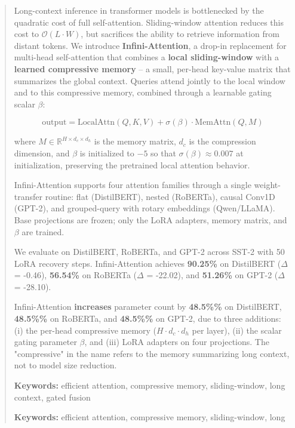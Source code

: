 \documentclass[10pt,twocolumn,letterpaper]{article}
\begin{document}
\maketitle

\begin{abstract}
Long-context inference in transformer models is bottlenecked by the quadratic 
cost of full self-attention. Sliding-window attention reduces this cost to 
$\mathcal{O}(L \cdot W)$, but sacrifices the ability to retrieve information 
from distant tokens. We introduce \textbf{Infini-Attention}, a drop-in replacement 
for multi-head self-attention that combines a \textbf{local sliding-window} with a 
\textbf{learned compressive memory} -- a small, per-head key-value matrix that 
summarizes the global context. Queries attend jointly to the local window and 
to this compressive memory, combined through a learnable gating scalar $\beta$:

\[
\text{output} = \text{LocalAttn}(Q, K, V) + \sigma(\beta) \cdot \text{MemAttn}(Q, M)
\]

where $M \in \mathbb{R}^{H \times d_c \times d_h}$ is the memory matrix, 
$d_c$ is the compression dimension, and $\beta$ is initialized to $-5$ so 
that $\sigma(\beta) \approx 0.007$ at initialization, preserving the 
pretrained local attention behavior.

Infini-Attention supports four attention families through a single 
weight-transfer routine: flat (DistilBERT), nested (RoBERTa), causal Conv1D 
(GPT-2), and grouped-query with rotary embeddings (Qwen/LLaMA). Base 
projections are frozen; only the LoRA adapters, memory matrix, and $\beta$ 
are trained.

We evaluate on DistilBERT, RoBERTa, and GPT-2 across SST-2 with 
50 LoRA recovery steps. Infini-Attention achieves 
\textbf{90.25\%} on DistilBERT ($\Delta$ = -0.46), \textbf{56.54\%} on RoBERTa 
($\Delta$ = -22.02), and \textbf{51.26\%} on GPT-2 ($\Delta$ = -28.10). 

Infini-Attention \textbf{increases} parameter count by \textbf{48.5\%\%} 
on DistilBERT, \textbf{48.5\%\%} on RoBERTa, and 
\textbf{48.5\%\%} on GPT-2, due to three additions: (i) the 
per-head compressive memory ($H \cdot d_c \cdot d_h$ per layer), (ii) the 
scalar gating parameter $\beta$, and (iii) LoRA adapters on four projections. 
The "compressive" in the name refers to the memory summarizing long context, 
not to model size reduction.

\textbf{Keywords:} efficient attention, compressive memory, sliding-window, long 
context, gated fusion



\vspace{0.5em}
\noindent\textbf{Keywords:} efficient attention, compressive memory, sliding-window, long
\end{abstract}
\end{document}
